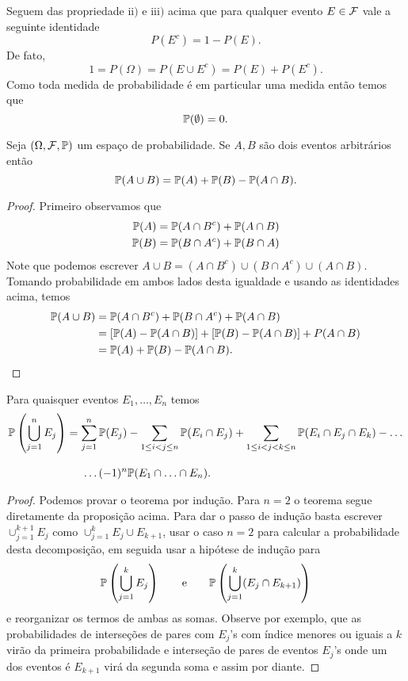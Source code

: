 Seguem das propriedade $\textrm{ii})$ e $\textrm{iii})$ acima que 
para qualquer evento $E\in\F$ vale a seguinte identidade
	\[
		P(E^c)=1-P(E).
	\]
De fato, 
	\[
		1=P(\Omega)= P(E\cup E^c)=P(E)+P(E^c).
	\]
Como toda medida de probabilidade é em particular uma medida então 
temos que 
	\[
		\P(\emptyset)=0.
	\] 
\begin{proposicao} Seja $(\Omega,\F,\P)$ um espaço de probabilidade.
Se $A,B$ são dois eventos arbitrários então 
	\[
		\P(A\cup B) = \P(A)+\P(B)-\P(A\cap B).
	\]
\end{proposicao}
\begin{proof}
Primeiro observamos que 
%	
	\begin{align*}
		\P(A) = \P(A\cap B^c)+\P(A\cap B) 
		\\
		\P(B) = \P(B\cap A^c)+\P(B\cap A) 
	\end{align*}
Note que podemos escrever $A\cup B = (A\cap B^c) \cup (B\cap A^c) \cup (A\cap B)$.
Tomando probabilidade em ambos lados desta igualdade 
e usando as identidades acima, temos
	\begin{align*}
	\P(A\cup B) 
	&=
	\P(A\cap B^c) + \P(B\cap A^c) + \P(A\cap B)
	\\
	&=
	[\P(A)-\P(A\cap B)] + [\P(B)-\P(A\cap B)] + P(A\cap B)
	\\
	&=
	\P(A)+\P(B)-\P(A\cap B).
	\end{align*}


\end{proof}

\begin{teorema}
Para quaisquer eventos $E_1,\ldots,E_n$ temos 
	\begin{align*}
		\P\left( \bigcup_{j=1}^{n} E_j \right)
		&=
		\sum_{j=1}^n \P(E_j)
		-
		\sum_{1\leq i<j\leq n} \P(E_i\cap E_j) 
		+
		\sum_{1\leq i<j<k\leq n} \P(E_i\cap E_j\cap E_k)-\ldots
		\\[0.3cm]
		&\hspace*{0.5cm} \ldots(-1)^n \P(E_1\cap\ldots\cap E_n).
	\end{align*}
\end{teorema}

\begin{proof}
 Podemos provar o teorema por indução. Para $n=2$ o teorema
 segue diretamente da proposição acima. Para dar o passo de 
 indução basta escrever $\cup_{j=1}^{k+1} E_j$ 
 como $\cup_{j=1}^{k}E_j\cup E_{k+1}$, usar o caso $n=2$ 
 para calcular a probabilidade desta decomposição, em seguida usar 
 a hipótese de indução para 
 \[	
 \P \left( \bigcup_{j=1}^{k} E_j \right)
 \qquad
 \text{e}
 \qquad
 \P \left( \bigcup_{j=1}^{k} (E_j\cap E_{k+1}) \right)
 \]
 e reorganizar os termos de ambas as somas. Observe 
 por exemplo, que as probabilidades de interseções de pares 
 com $E_j$'s com índice menores ou iguais a $k$ virão 
 da primeira probabilidade e interseção de pares de
 eventos $E_j$'s onde um dos eventos é $E_{k+1}$ virá 
 da segunda soma e assim por diante.
\end{proof}


